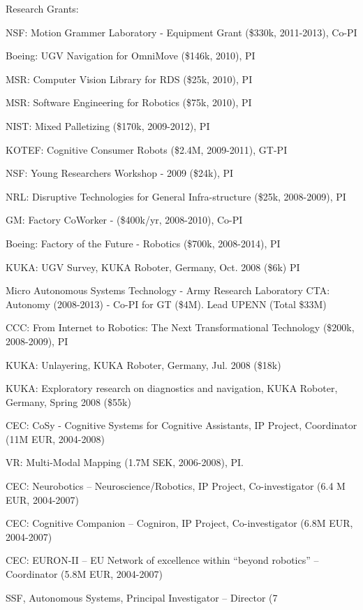 \documentclass{article}
\begin{document}
\begin{cv}
\begin{cvlist}{Research Grants:}
\item NSF: Motion Grammer Laboratory - Equipment Grant (\$330k, 2011-2013), Co-PI
\item Boeing: UGV Navigation for OmniMove (\$146k, 2010), PI
\item MSR: Computer Vision Library for RDS (\$25k, 2010), PI
\item MSR: Software Engineering for Robotics (\$75k, 2010), PI
\item NIST: Mixed Palletizing (\$170k, 2009-2012), PI
\item KOTEF: Cognitive Consumer Robots (\$2.4M, 2009-2011), GT-PI
\item NSF: Young Researchers Workshop - 2009 (\$24k), PI
\item NRL: Disruptive Technologies for General Infra-structure  (\$25k, 2008-2009), PI
\item GM: Factory CoWorker - (\$400k/yr, 2008-2010), Co-PI
\item Boeing: Factory of the Future - Robotics (\$700k, 2008-2014), PI
\item KUKA: UGV Survey, KUKA Roboter, Germany, Oct. 2008 (\$6k)  PI%
\item Micro Autonomous Systems Technology - Army Research Laboratory
  CTA: Autonomy (2008-2013) - Co-PI for GT (\$4M). Lead UPENN (Total \$33M) %
\item CCC: From Internet to Robotics: The Next Transformational
  Technology (\$200k, 2008-2009), PI %
\item KUKA: Unlayering, KUKA Roboter, Germany, Jul. 2008 (\$18k) %
\item KUKA: Exploratory research on diagnostics and navigation, KUKA
  Roboter, Germany, Spring 2008 (\$55k)%
\item CEC: CoSy - Cognitive Systems for Cognitive Assistants, IP
  Project, Coordinator (11M EUR, 2004-2008)
\item VR: Multi-Modal Mapping (1.7M SEK, 2006-2008), PI.%
\item CEC: Neurobotics -- Neuroscience/Robotics, IP Project,
  Co-investigator (6.4 M EUR, 2004-2007)%
\item CEC: Cognitive Companion -- Cogniron, IP Project,
  Co-investigator (6.8M EUR, 2004-2007) %
\item CEC: EURON-II -- EU Network of excellence within ``beyond
  robotics''  -- Coordinator (5.8M EUR, 2004-2007) %
\item SSF, Autonomous Systems, Principal Investigator -- Director  (7

\end{cvlist}
\end{cv}
\end{document}
